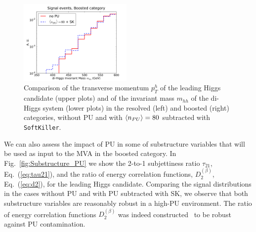 \begin{figure}[t]
\begin{center}
  \includegraphics[width=0.49\textwidth]{plots/m_HH_C2_bst_comp.pdf}
  \caption{\small
    Comparison of the transverse momentum $p_T^h$ of the leading
    Higgs candidate (upper plots) and of the invariant mass $m_{hh}$
    of the di-Higgs system (lower plots) in the resolved
    (left) and boosted (right) categories,
    without PU and with $\left\langle n_{PU}\right\rangle=80$ subtracted with {\tt SoftKiller}.
}
\label{fig:mHH_PU}
\end{center}
\end{figure}

We can also assess the impact of PU in some of
substructure variables that will be 
used as input to the MVA in the boosted category.
%
In Fig.~\ref{fig:Substructure_PU} we show the 2-to-1 subjettiness ratio
$\tau_{21}$, Eq.~(\ref{eq:tau21}), and the ratio
of energy correlation functions, $D_2^{(\beta)}$,
Eq.~(\ref{eq:d2}), for the leading Higgs candidate.
%
Comparing the signal distributions in the cases without PU and
with PU subtracted with SK, we observe that both substructure variables
are reasonably robust in a high-PU environment.
%
The ratio of energy correlation functions $D_2^{(\beta)}$ 
was indeed constructed~\cite{Larkoski:2013eya}
to be robust against PU contamination.
%

